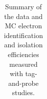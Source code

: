 \begin{table}[htb]
\begin{center}
\scriptsize
\caption{\label{tab:eltnpeff}
Summary of the data and MC electron identification and isolation efficiencies measured with tag-and-probe studies.}
\begin{tabular}{c|c|c}




\end{tabular}
\end{center}
\end{table}

